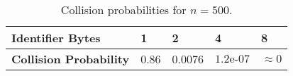 \begin{table}[ht]
  \centering
  \begin{tabular}{|l|l|l|l|l|}
    \hline
    \textbf{Identifier Bytes} & 1 & 2 & 4 & 8 \\
    \hline
    \textbf{Collision Probability}
    & 0.86 & 0.0076 & $1.2\text{e-07}$ & ${\approx}0$ \\
    \hline
  \end{tabular}
  \caption{Collision probabilities for $n=500$.
  }
  \label{tab:quack:collision-prob}
\end{table}
